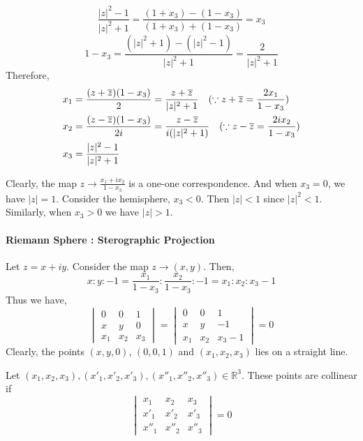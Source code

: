 	\[ \frac{|z|^2-1}{|z|^2+1} = \frac{(1+x_3)-(1-x_3)}{(1+x_3)+(1-x_3)} = x_3  \]
	\[ 1-x_3 = \frac{(|z|^2+1) - (|z|^2-1)}{|z|^2+1} = \frac{2}{|z|^2+1} \]
Therefore,
\begin{align}
	 x_1 & = \frac{(z+\overline{z})(1-x_3)}{2} = \frac{z+\overline{z}}{|z|^2+1}\quad (\because z + \overline{z} = \frac{2x_1}{1-x_3}) \\
	 x_2 & = \frac{(z-\overline{z})(1-x_3)}{2i} = \frac{z-\overline{z}}{i(|z|^2+1)}\quad (\because z - \overline{z} = \frac{2ix_2}{1-x_3}) \\
	x_3 & = \frac{|z|^2-1}{|z|^2+1}
\end{align}

Clearly, the map $z \to \displaystyle \frac{x_1+ix_2}{1-x_3}$ is a one-one correspondence.
And when $x_3 = 0$, we have $|z| = 1$.
Consider the hemisphere, $x_3 < 0$.
Then $|z|<1$ since $|z|^2<1$.
Similarly, when $x_3 > 0$ we have $|z|>1$.

\paragraph{Riemann Sphere : Sterographic Projection}
Let $z = x+iy$.
Consider the map $z \to (x,y)$.
Then,
\[ x:y:-1 = \frac{x_1}{1-x_3} : \frac{x_2}{1-x_3} : -1 = x_1 : x_2 : x_3-1 \]
Thus we have,
\[ \begin{vmatrix} 0 & 0 & 1 \\ x & y & 0 \\ x_1 & x_2 & x_3 \end{vmatrix} = \begin{vmatrix} 0 & 0 & 1 \\ x & y & -1 \\ x_1 & x_2 & x_3-1\end{vmatrix} = 0 \]
Clearly, the points $(x,y,0)$, $(0,0,1)$ and $(x_1,x_2,x_3)$ lies on a straight line.\\

\begin{commentary}
\begin{definition}[collinear]
	Let $(x_1,x_2,x_3), (x'_1,x'_2,x'_3), (x''_1,x''_2,x''_3) \in \mathbb{R}^3$.
	These points are collinear if
	\[ \begin{vmatrix} x_1 & x_2 & x_3 \\ x'_1 & x'_2 & x'_3 \\ x''_1 & x''_2 & x''_3 \end{vmatrix} = 0\]
\end{definition}
\end{commentary}

